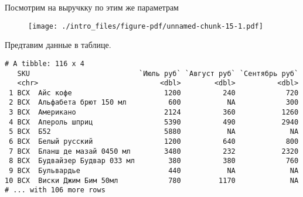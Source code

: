 \documentclass[
  letterpaper,
  DIV=11,
  numbers=noendperiod]{scrreport}
\begin{document}
Посмотрим на выручкку по этим же параметрам

\begin{figure}

{\centering \texttt{[image: ./intro\_files/figure-pdf/unnamed-chunk-15-1.pdf]}

}

\end{figure}

Предтавим данные в таблице.

\begin{verbatim}
# A tibble: 116 x 4
   SKU                          `Июль руб` `Август руб` `Сентябрь руб`
   <chr>                             <dbl>        <dbl>          <dbl>
 1 ВСХ  Айс кофе                      1200          240            720
 2 ВСХ  Альфабета брют 150 мл          600           NA            300
 3 ВСХ  Американо                     2124          360           1260
 4 ВСХ  Апероль шприц                 5390          490           2940
 5 ВСХ  Б52                           5880           NA             NA
 6 ВСХ  Белый русский                 1200          640            800
 7 ВСХ  Бланш де мазай 0450 мл        3480          232           2320
 8 ВСХ  Будвайзер Будвар 033 мл        380          380            760
 9 ВСХ  Бульвардье                     440           NA             NA
10 ВСХ  Виски Джим Бим 50мл            780         1170             NA
# ... with 106 more rows
\end{verbatim}
\end{document}

